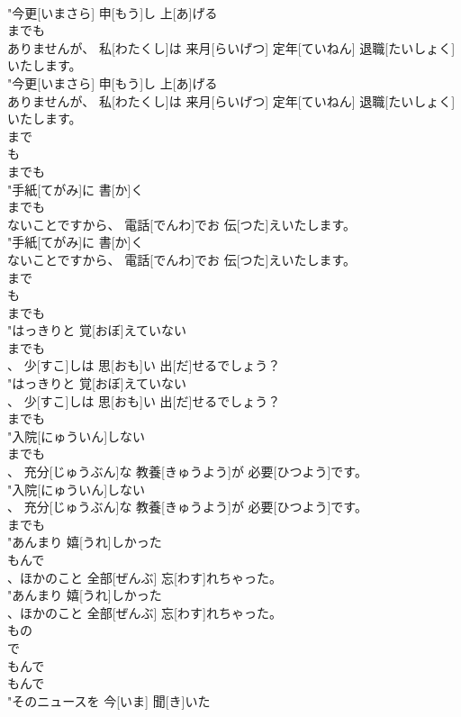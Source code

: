 \documentclass[8pt]{extreport}
\begin{document}
\begin{CJK}{UTF8}{min}
\\	"今更[いまさら] 申[もう]し 上[あ]げる
\\	までも
\\	ありませんが、 私[わたくし]は 来月[らいげつ] 定年[ていねん] 退職[たいしょく]いたします。
\\	"今更[いまさら] 申[もう]し 上[あ]げる
\\	ありませんが、 私[わたくし]は 来月[らいげつ] 定年[ていねん] 退職[たいしょく]いたします。
\\	まで 
\\	も 
\\	までも
\\	"手紙[てがみ]に 書[か]く
\\	までも
\\	ないことですから、 電話[でんわ]でお 伝[つた]えいたします。
\\	"手紙[てがみ]に 書[か]く
\\	ないことですから、 電話[でんわ]でお 伝[つた]えいたします。
\\	まで 
\\	も 
\\	までも
\\	"はっきりと 覚[おぼ]えていない
\\	までも
\\	、 少[すこ]しは 思[おも]い 出[だ]せるでしょう？
\\	"はっきりと 覚[おぼ]えていない
\\	、 少[すこ]しは 思[おも]い 出[だ]せるでしょう？
\\	までも
\\	"入院[にゅういん]しない
\\	までも
\\	、 充分[じゅうぶん]な 教養[きゅうよう]が 必要[ひつよう]です。
\\	"入院[にゅういん]しない
\\	、 充分[じゅうぶん]な 教養[きゅうよう]が 必要[ひつよう]です。
\\	までも
\\	"あんまり 嬉[うれ]しかった
\\	もんで
\\	、ほかのこと 全部[ぜんぶ] 忘[わす]れちゃった。
\\	"あんまり 嬉[うれ]しかった
\\	、ほかのこと 全部[ぜんぶ] 忘[わす]れちゃった。
\\	もの 
\\	で 
\\	もんで 
\\	もんで
\\	"そのニュースを 今[いま] 聞[き]いた

\end{CJK}
\end{document}
